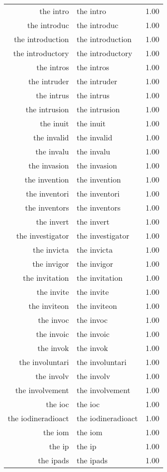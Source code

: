 \begin{table}[ht]
\begin{tabular}{rlr}
  the intro & the intro & 1.00 \\ 
  the introduc & the introduc & 1.00 \\ 
  the introduction & the introduction & 1.00 \\ 
  the introductory & the introductory & 1.00 \\ 
  the intros & the intros & 1.00 \\ 
  the intruder & the intruder & 1.00 \\ 
  the intrus & the intrus & 1.00 \\ 
  the intrusion & the intrusion & 1.00 \\ 
  the inuit & the inuit & 1.00 \\ 
  the invalid & the invalid & 1.00 \\ 
  the invalu & the invalu & 1.00 \\ 
  the invasion & the invasion & 1.00 \\ 
  the invention & the invention & 1.00 \\ 
  the inventori & the inventori & 1.00 \\ 
  the inventors & the inventors & 1.00 \\ 
  the invert & the invert & 1.00 \\ 
  the investigator & the investigator & 1.00 \\ 
  the invicta & the invicta & 1.00 \\ 
  the invigor & the invigor & 1.00 \\ 
  the invitation & the invitation & 1.00 \\ 
  the invite & the invite & 1.00 \\ 
  the inviteon & the inviteon & 1.00 \\ 
  the invoc & the invoc & 1.00 \\ 
  the invoic & the invoic & 1.00 \\ 
  the invok & the invok & 1.00 \\ 
  the involuntari & the involuntari & 1.00 \\ 
  the involv & the involv & 1.00 \\ 
  the involvement & the involvement & 1.00 \\ 
  the ioc & the ioc & 1.00 \\ 
  the iodineradioact & the iodineradioact & 1.00 \\ 
  the iom & the iom & 1.00 \\ 
  the ip & the ip & 1.00 \\ 
  the ipads & the ipads & 1.00 \\ 

\end{tabular}
\end{table}
